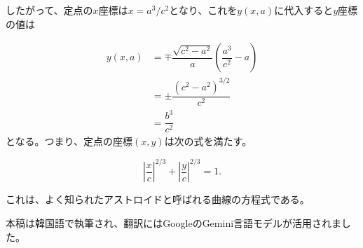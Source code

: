 \documentclass[twocolumn]{article}
\begin{document}
	したがって、定点の$x$座標は$x = a^3/c^2$となり、これを$y(x, a)$に代入すると$y$座標の値は
	
	$$ \begin{aligned}
		y(x, a) &= \mp \dfrac{\sqrt{c^2-a^2}}{a}\left(\dfrac{a^3}{c^2}-a\right)\\
		& = \pm \dfrac{\left( c^2- a^2 \right)^{3/2}}{c^2}\\
		& = \dfrac{b^3}{c^2}
	\end{aligned}
	$$
%	
	となる。つまり、定点の座標$(x, y)$は次の式を満たす。
	
	$$ \left|\dfrac{x}{c}\right|^{2/3} + \left|\dfrac{y}{c}\right|^{2/3} = 1. $$
	
	これは、よく知られたアストロイドと呼ばれる曲線の方程式である。
	
	\vfill
	

	\noindent
	本稿は韓国語で執筆され、翻訳にはGoogleのGemini言語モデルが活用されました。
%	
%	
	
\end{document}
